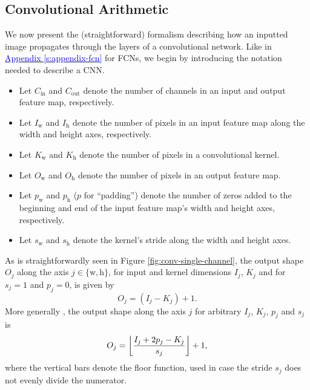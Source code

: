 \documentclass[11pt, a4paper]{article}
\newcommand{\myhref}[2]{\hyperref[#1]{\textcolor{blue}{#2}}}
\DeclarePairedDelimiter\floor{\lfloor}{\rfloor}  %
\begin{document}
\subsection{Convolutional Arithmetic} \label{ss:conv-arithmetic}
We now present the (straightforward) formalism describing how an inputted image propagates through the layers of a convolutional network.
Like in \myhref{s:appendix-fcn}{Appendix \ref{s:appendix-fcn}} for FCNs, we begin by introducing the notation needed to describe a CNN.
\begin{itemize}

    \item Let $ C_{\text{in}} $ and $ C_{\text{out}} $ denote the number of channels in an input and output feature map, respectively.

    \item Let $ I_{\text{w}} $ and $ I_{\text{h}} $ denote the number of pixels in an input feature map along the width and height axes, respectively.

    \item Let $ K_{\text{w}} $ and $ K_{\text{h}} $ denote the number of pixels in a convolutional kernel. %

    \item Let $ O_{\text{w}} $ and $ O_{\text{h}} $ denote the number of pixels in an output feature map. %

    \item Let $ p_{\text{w}} $ and $ p_{\text{h}} $ ($ p $ for ``padding'') denote the number of zeros added to the beginning and end of the input feature map's width and height axes, respectively.

    \item Let $ s_{\text{w}} $ and $ s_{\text{h}} $ denote the kernel's stride along the width and height axes.

\end{itemize}
As is straightforwardly seen in Figure \ref{fig:conv-single-channel}, the output shape $ O_{j} $ along the axis $ j \in \{\text{w}, \text{h}\} $, for input and kernel dimensions $ I_{j} $, $ K_{j} $ and for $ s_{j} = 1 $ and $ p_{j} = 0 $, is given by
\begin{equation*}
    O_{j} = (I_{j} - K_{j}) + 1.
\end{equation*}
More generally \cite{cnn-guide}, the output shape along the axis $ j $ for arbitrary $ I_{j} $, $ K_{j} $, $ p_{j} $ and $ s_{j} $ is
\begin{equation}
    O_{j} = \floor*{\frac{I_{j} + 2p_{j} - K_{j}}{s_{j}}} + 1, \label{eq:cnn-O-conv}
\end{equation}
where the vertical bars denote the floor function, used in case the stride $ s_{j} $ does not evenly divide the numerator.
\end{document}
